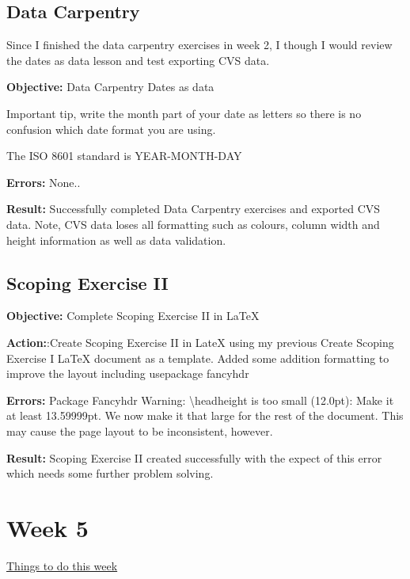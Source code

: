 \documentclass[a4paper,12pt]{article}
\begin{document}
\subsection{Data Carpentry}

Since I finished the data carpentry exercises in week 2, I though I would review the dates as data lesson and test exporting CVS data.

\noindent \textbf{Objective:} Data Carpentry Dates as data

Important tip, write the month part of your date as letters so there is no confusion which date format you are using. 

The ISO 8601 standard is YEAR-MONTH-DAY

\noindent \textbf{Errors:} None..

\noindent \textbf{Result:} Successfully completed Data Carpentry exercises and exported CVS data. Note, CVS data loses all formatting such as colours, column width and height information as well as data validation. 

\subsection{Scoping Exercise II}

\noindent \textbf{Objective:} Complete Scoping Exercise II in LaTeX

\noindent \textbf{Action:}:Create Scoping Exercise II in LateX using my previous Create Scoping Exercise I LaTeX document as a template. Added some addition formatting to improve the layout including usepackage fancyhdr

\noindent \textbf{Errors:} Package Fancyhdr Warning: \textbackslash headheight is too small (12.0pt): Make it at least 13.59999pt. We now make it that large for the rest of the document. This may cause the page layout to be inconsistent, however.

\noindent \textbf{Result:} Scoping Exercise II created successfully with the expect of this error which needs some further problem solving.
 
\newpage

\section{Week 5}

\underline {Things to do this week}
 
\end{document}
